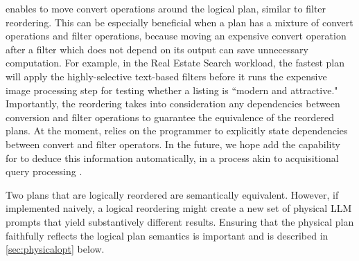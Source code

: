  enables \system{} to move convert operations around the logical plan, similar to filter reordering. This can be especially beneficial when a plan has a mixture of convert operations and filter operations, because moving an expensive convert operation after a filter which does not depend on its output can save unnecessary computation. For example, in the Real Estate Search workload, the fastest plan will apply the highly-selective text-based filters before it runs the expensive image processing step for testing whether a listing is ``modern and attractive." Importantly, the reordering takes into consideration any dependencies between conversion and filter operations to guarantee the equivalence of the reordered plans. At the moment, \system{} relies on the programmer to explicitly state dependencies between convert and filter operators. In the future, we hope add the capability for \system{} to deduce this information automatically, in a process akin to acquisitional query processing \cite{madden2003acqp}.

Two plans that are logically reordered are semantically equivalent. However, if implemented naively, a logical reordering might create a new set of physical LLM prompts that yield substantively different results.  Ensuring that the physical plan faithfully reflects the logical plan semantics is important and is described in \autoref{sec:physicalopt} below.





